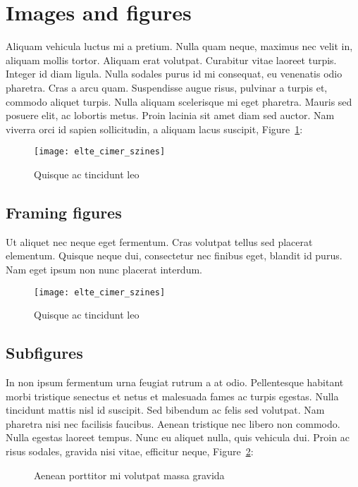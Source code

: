 \section{Images and figures}

Aliquam vehicula luctus mi a pretium. Nulla quam neque, maximus nec velit in, aliquam mollis tortor. Aliquam erat volutpat. Curabitur vitae laoreet turpis. Integer id diam ligula. Nulla sodales purus id mi consequat, eu venenatis odio pharetra. Cras a arcu quam. Suspendisse augue risus, pulvinar a turpis et, commodo aliquet turpis. Nulla aliquam scelerisque mi eget pharetra. Mauris sed posuere elit, ac lobortis metus. Proin lacinia sit amet diam sed auctor. Nam viverra orci id sapien sollicitudin, a aliquam lacus suscipit, Figure~\ref{fig:example-1}:

\begin{figure}[H]
	\centering
	\texttt{[image: elte\_cimer\_szines]}
	\caption{Quisque ac tincidunt leo}
	\label{fig:example-1}
\end{figure}

\subsection{Framing figures}

Ut aliquet nec neque eget fermentum. Cras volutpat tellus sed placerat elementum. Quisque neque dui, consectetur nec finibus eget, blandit id purus. Nam eget ipsum non nunc placerat interdum.

\begin{figure}[H]
	\centering
	\texttt{[image: elte\_cimer\_szines]}
	\caption{Quisque ac tincidunt leo}
\end{figure}

\subsection{Subfigures}

In non ipsum fermentum urna feugiat rutrum a at odio. Pellentesque habitant morbi tristique senectus et netus et malesuada fames ac turpis egestas. Nulla tincidunt mattis nisl id suscipit. Sed bibendum ac felis sed volutpat. Nam pharetra nisi nec facilisis faucibus. Aenean tristique nec libero non commodo. Nulla egestas laoreet tempus. Nunc eu aliquet nulla, quis vehicula dui. Proin ac risus sodales, gravida nisi vitae, efficitur neque, Figure~\ref{fig:example-2}:

\begin{figure}[H]
	\centering
	\hspace{5pt}
	\caption{Aenean porttitor mi volutpat massa gravida}
	\label{fig:example-2}
\end{figure}


